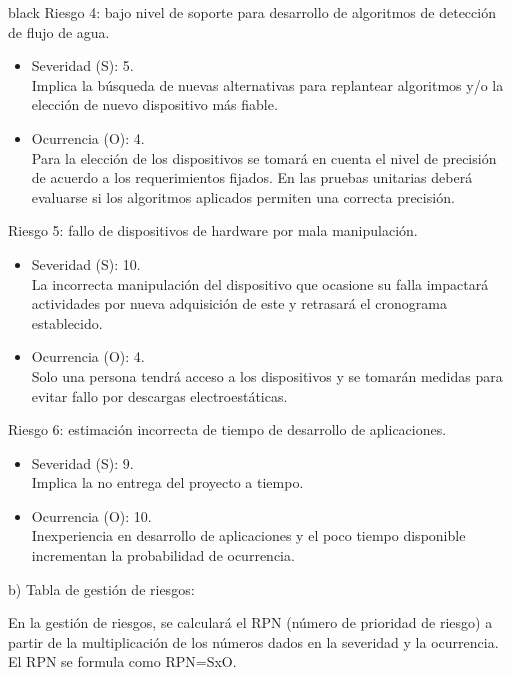 \documentclass[
11pt, %
codirector, %
]{charter}
\begin{document}
\begin{consigna}{black}
Riesgo 4: bajo nivel de soporte para desarrollo de algoritmos de detección de flujo de agua.
\begin{itemize}
	\item Severidad (S): 5. \\
	Implica la búsqueda de nuevas alternativas para replantear algoritmos y/o la elección de nuevo dispositivo más fiable.
	\item Ocurrencia (O): 4. \\
	Para la elección de los dispositivos se tomará en cuenta el nivel de precisión de acuerdo a los requerimientos fijados. En las pruebas unitarias deberá evaluarse si los algoritmos aplicados permiten una correcta precisión.
\end{itemize}

Riesgo 5: fallo de dispositivos de hardware por mala manipulación.
\begin{itemize}
	\item Severidad (S): 10. \\
	La incorrecta manipulación del dispositivo que ocasione su falla impactará actividades por nueva adquisición de este y retrasará el cronograma establecido.
	\item Ocurrencia (O): 4. \\
	Solo una persona tendrá acceso a los dispositivos y se tomarán medidas para evitar fallo por descargas electroestáticas.
\end{itemize}

Riesgo 6: estimación incorrecta de tiempo de desarrollo de aplicaciones.
\begin{itemize}
	\item Severidad (S): 9. \\
	Implica la no entrega del proyecto a tiempo.
	\item Ocurrencia (O): 10. \\
	Inexperiencia en desarrollo de aplicaciones y el poco tiempo disponible incrementan la probabilidad de ocurrencia.
\end{itemize}



b) Tabla de gestión de riesgos:      

En la gestión de riesgos, se calculará el RPN (número de prioridad de riesgo) a partir de la multiplicación de los números dados en la severidad y la ocurrencia. El RPN se formula como RPN=SxO.


\end{consigna}
\end{document}
